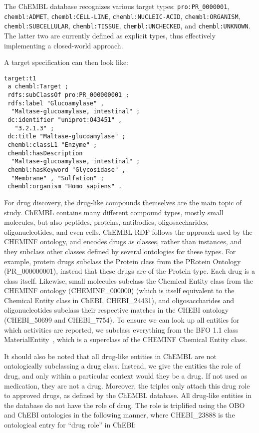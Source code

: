 \documentclass[10pt]{bmc_article}
\newenvironment{bmcformat}{\begin{raggedright}\baselineskip20pt\sloppy\setboolean{publ}{false}}{\end{raggedright}\baselineskip20pt\sloppy}
\begin{document}
\begin{bmcformat}
The ChEMBL database
recognizes various target types: \verb+pro:PR_0000001+, \verb+chembl:ADMET+, \verb+chembl:CELL-LINE+,
\verb+chembl:NUCLEIC-ACID+, \verb+chembl:ORGANISM+, \verb+chembl:SUBCELLULAR+, \verb+chembl:TISSUE+,
\verb+chembl:UNCHECKED+, and \verb+chembl:UNKNOWN+. The latter two are currently defined as
explicit types, thus effectively implementing a closed-world approach. 

A target specification can then look like:

\begin{small}
\begin{verbatim}
target:t1
 a chembl:Target ;
 rdfs:subClassOf pro:PR_000000001 ;
 rdfs:label "Glucoamylase" , 
  "Maltase-glucoamylase, intestinal" ;
 dc:identifier "uniprot:O43451" ,
   "3.2.1.3" ;
 dc:title "Maltase-glucoamylase" ;
 chembl:classL1 "Enzyme" ;
 chembl:hasDescription
  "Maltase-glucoamylase, intestinal" ;
 chembl:hasKeyword "Glycosidase" , 
  "Membrane" , "Sulfation" ;
 chembl:organism "Homo sapiens" .
\end{verbatim}
\end{small}

For drug discovery, the drug-like compounds themselves are the main topic of study.
ChEMBL contains many different compound types, mostly small molecules,
but also peptides, proteins, antibodies, oligosaccharides, oligonucleotides, and
even cells. ChEMBL-RDF follows the approach used by the CHEMINF ontology,
and encodes drugs as classes, rather than instances, and they subclass
other classes defined by several ontologies for these types. For example, protein drugs subclass the
Protein class from the PRotein Ontology (PR\_000000001), instead that these drugs are
of the Protein type. Each drug is a class itself. Likewise, small
molecules subclass the Chemical Entity class from the CHEMINF
ontology (CHEMINF\_000000) (which is itself equivalent to the Chemical Entity class in ChEBI, CHEBI\_24431), 
and oligosaccharides and oligonucleotides
subclass their respective matches in the CHEBI ontology (CHEBI\_50699
and CHEBI\_7754). To ensure we can look up all entities for which activities
are reported, we subclass everything from the BFO 1.1 class MaterialEntity~\cite{Smith2004},
which is a superclass of the CHEMINF Chemical Entity class.

It should also be noted that all drug-like entities in ChEMBL are not ontologically
subclassing a drug class. Instead, we give the entities the role of drug, and only within a
particular context would they be a drug. If not used as medication, they are not a drug.
Moreover, the triples only attach this drug role to approved drugs, as defined by the
ChEMBL database. 
All drug-like entities in the database do not have the role of drug.
The role is triplified using the OBO and ChEBI ontologies in the following manner,
where CHEBI\_23888 is the ontological entry for ``drug role'' in ChEBI:


\end{bmcformat}
\end{document}
